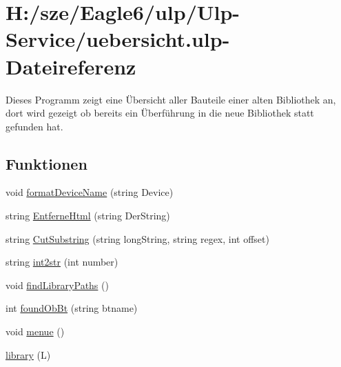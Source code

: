 \hypertarget{uebersicht_8ulp}{}\section{H\+:/sze/\+Eagle6/ulp/\+Ulp-\/\+Service/uebersicht.ulp-\/\+Dateireferenz}
\label{uebersicht_8ulp}


Dieses Programm zeigt eine Übersicht aller Bauteile einer alten Bibliothek an, dort wird gezeigt ob bereits ein Überführung in die neue Bibliothek statt gefunden hat.  


\subsection*{Funktionen}
\begin{DoxyCompactItemize}
\item 
void \hyperlink{uebersicht_8ulp_acabc64ef6155f972a1d2a6ea60861a24}{format\+Device\+Name} (string Device)
\item 
string \hyperlink{uebersicht_8ulp_affb7653b8ee9a0799892c4def8af973b}{Entferne\+Html} (string Der\+String)
\item 
string \hyperlink{uebersicht_8ulp_a2fd71140ea5241c20d59c939c655627e}{Cut\+Substring} (string long\+String, string regex, int offset)
\item 
string \hyperlink{uebersicht_8ulp_aabffd2ab08d259550d4750cfa9c249dc}{int2str} (int number)
\item 
void \hyperlink{uebersicht_8ulp_a55df951f7a18b89ce987f3940ebdcccb}{find\+Library\+Paths} ()
\item 
int \hyperlink{uebersicht_8ulp_ad6dfbe94b6bed6608664054ae066549a}{found\+Ob\+Bt} (string btname)
\item 
void \hyperlink{uebersicht_8ulp_ac248a09f8f1e9d8c6e7db963fb66dc6a}{menue} ()
\item 
\hyperlink{uebersicht_8ulp_a825a5a33f9ea1598f17dac249716ae7e}{library} (L)
\end{DoxyCompactItemize}

